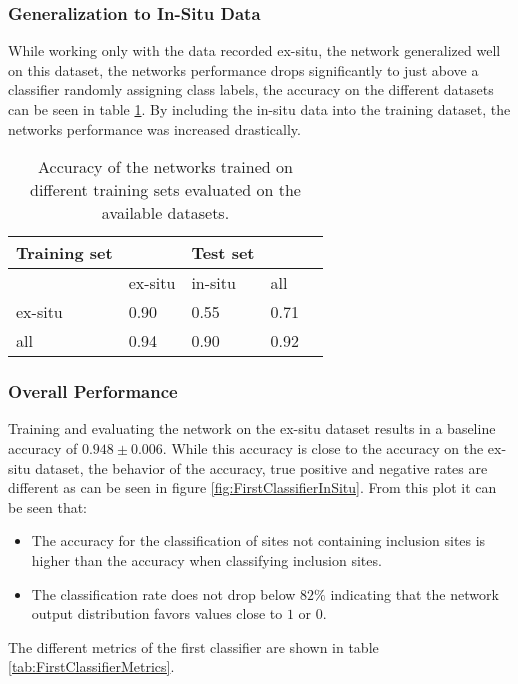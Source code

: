 \subsubsection{Generalization to In-Situ Data}

While working only with the data recorded ex-situ, the network generalized well on this dataset, the networks performance drops significantly to just above a classifier randomly assigning class labels, the accuracy on the different datasets can be seen in table \ref{tab:AccuracyComparisonInception}. By including the in-situ data into the training dataset, the networks performance was increased drastically. \\

\begin{table}[H]
 \begin{center}
  \begin{tabular}{@{} *5l @{}} \toprule[2pt]
   Training set &  &Test set&  \\\midrule
    & ex-situ  & in-situ  & all   \\ 
   ex-situ  & 0.90 & 0.55 & 0.71\\ 
   all  & 0.94 & 0.90 & 0.92\\\bottomrule[2pt]

  \end{tabular}
 \end{center}
 \caption{Accuracy of the networks trained on different training sets evaluated on the available datasets.}
 \label{tab:AccuracyComparisonInception}
\end{table}



\subsubsection{Overall Performance}

Training and evaluating the network on the ex-situ dataset results in a baseline accuracy of $0.948\pm 0.006$. While this accuracy is close to the accuracy on the ex-situ dataset, the behavior of the accuracy, true positive and negative rates are different as can be seen in figure \ref{fig:FirstClassifierInSitu}. From this plot it can be seen that:
\begin{itemize}
\item The accuracy for the classification of sites not containing inclusion sites is higher than the accuracy when classifying inclusion sites. 
\item The classification rate does not drop below $82\%$ indicating that the network output distribution favors values close to $1$ or $0$.
\end{itemize}
The different metrics of the first classifier are shown in table \ref{tab:FirstClassifierMetrics}.

